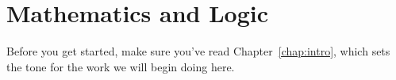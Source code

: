\chapter{Mathematics and Logic}\label{chap:IntroToMath}

Before you get started, make sure you've read Chapter~\ref{chap:intro}, which sets the tone for the work we will begin doing here.